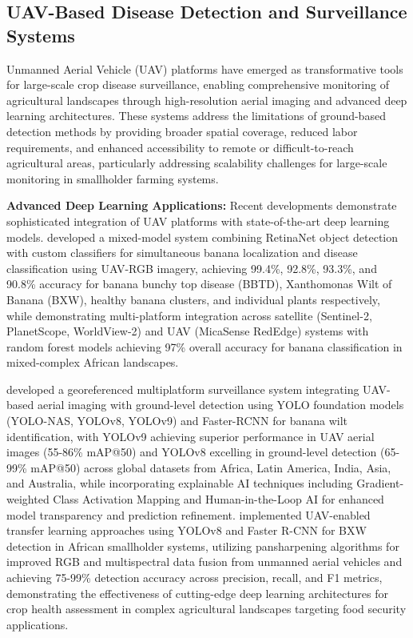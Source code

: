 \documentclass[sn-mathphys]{sn-jnl}
\theoremstyle{thmstyleone}%
\theoremstyle{thmstyletwo}%
\theoremstyle{thmstylethree}%
\begin{document}
\subsection{UAV-Based Disease Detection and Surveillance Systems}

Unmanned Aerial Vehicle (UAV) platforms have emerged as transformative tools for large-scale crop disease surveillance, enabling comprehensive monitoring of agricultural landscapes through high-resolution aerial imaging and advanced deep learning architectures. These systems address the limitations of ground-based detection methods by providing broader spatial coverage, reduced labor requirements, and enhanced accessibility to remote or difficult-to-reach agricultural areas, particularly addressing scalability challenges for large-scale monitoring in smallholder farming systems.

\textbf{Advanced Deep Learning Applications:} Recent developments demonstrate sophisticated integration of UAV platforms with state-of-the-art deep learning models. \citet{selvaraj2020detection} developed a mixed-model system combining RetinaNet object detection with custom classifiers for simultaneous banana localization and disease classification using UAV-RGB imagery, achieving 99.4\%, 92.8\%, 93.3\%, and 90.8\% accuracy for banana bunchy top disease (BBTD), Xanthomonas Wilt of Banana (BXW), healthy banana clusters, and individual plants respectively, while demonstrating multi-platform integration across satellite (Sentinel-2, PlanetScope, WorldView-2) and UAV (MicaSense RedEdge) systems with random forest models achieving 97\% overall accuracy for banana classification in mixed-complex African landscapes. 

\citet{mora2025digital} developed a georeferenced multiplatform surveillance system integrating UAV-based aerial imaging with ground-level detection using YOLO foundation models (YOLO-NAS, YOLOv8, YOLOv9) and Faster-RCNN for banana wilt identification, with YOLOv9 achieving superior performance in UAV aerial images (55-86\% mAP@50) and YOLOv8 excelling in ground-level detection (65-99\% mAP@50) across global datasets from Africa, Latin America, India, Asia, and Australia, while incorporating explainable AI techniques including Gradient-weighted Class Activation Mapping and Human-in-the-Loop AI for enhanced model transparency and prediction refinement. \citet{mora2024pixels} implemented UAV-enabled transfer learning approaches using YOLOv8 and Faster R-CNN for BXW detection in African smallholder systems, utilizing pansharpening algorithms for improved RGB and multispectral data fusion from unmanned aerial vehicles and achieving 75-99\% detection accuracy across precision, recall, and F1 metrics, demonstrating the effectiveness of cutting-edge deep learning architectures for crop health assessment in complex agricultural landscapes targeting food security applications.
\end{document}
